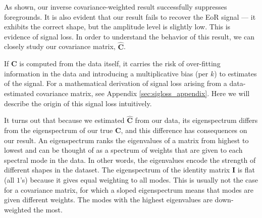 \documentclass[preprint2,numberedappendix,tighten]{aastex6}  %
\begin{document}
As shown, our inverse covariance-weighted result successfully suppresses foregrounds. It is also evident that our result fails to recover the EoR signal --- it exhibits the correct shape, but the amplitude level is slightly low. This is evidence of signal loss. In order to understand the behavior of this result, we can closely study our covariance matrix, $\hat{\textbf{C}}$. %

If $\textbf{C}$ is computed from the data itself, it carries the risk of over-fitting information in the data and introducing a multiplicative bias (per $k$) to estimates of the signal. For a mathematical derivation of signal loss arising from a data-estimated covariance matrix, see Appendix \ref{sec:sigloss_appendix}. Here we will describe the origin of this signal loss intuitively.

It turns out that because we estimated $\hat{\textbf{C}}$ from our data, its eigenspectrum differs from the eigenspectrum of our true $\textbf{C}$, and this difference has consequences on our result. An eigenspectrum ranks the eigenvalues of a matrix from highest to lowest and can be thought of as a spectrum of weights that are given to each spectral mode in the data. In other words, the eigenvalues encode the strength of different shapes in the dataset. The eigenspectrum of the identity matrix $\textbf{I}$ is flat (all $1$'s) because it gives equal weighting to all modes. This is usually not the case for a covariance matrix, for which a sloped eigenspectrum means that modes are given different weights. The modes with the highest eigenvalues are down-weighted the most. 
\end{document}
